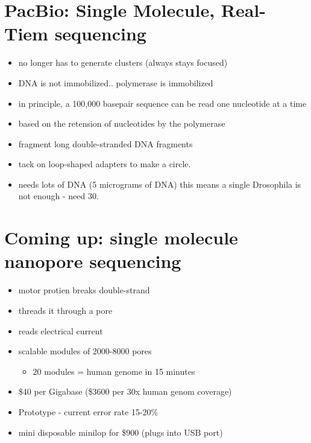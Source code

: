 \documentclass{article}
\begin{document}
    \section{PacBio: Single Molecule, Real-Tiem sequencing}
        \begin{itemize}
            \item no longer has to generate clusters (always stays focused)
            \item DNA is not immobilized.. polymerase is immobilized
            \item in principle, a 100,000 basepair sequence can be read one nucleotide at a time
            \item based on the retension of nucleotides by the polymerase
            \item fragment long double-stranded DNA fragments
            \item tack on loop-shaped adapters to make a circle.
            \item needs lots of DNA (5 micrograms of DNA) this means a single Drosophila is not enough - need 30.
        \end{itemize}

    \section{Coming up: single molecule nanopore sequencing}
        \begin{itemize}
            \item motor protien breaks double-strand
            \item threads it through a pore
            \item reads electrical current
            \item scalable modules of 2000-8000 pores
            \begin{itemize}
                \item 20 modules = human genome in 15 minutes
            \end{itemize}
            \item \$40 per Gigabase (\$3600 per 30x human genom coverage)
            \item Prototype - current error rate 15-20\%
            \item mini disposable minilop for \$900 (plugs into USB port)
        \end{itemize}
\end{document}
